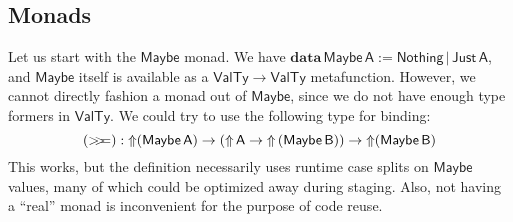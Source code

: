\documentclass[acmsmall,screen,review,anonymous]{acmart}
\newcommand{\msf}[1]{{\mathsf{#1}}}
\newcommand{\mbf}[1]{{\mathbf{#1}}}
\newcommand{\data}{\mbf{data}\,}
\newcommand{\vA}{\mathsf{A}}
\newcommand{\vB}{\mathsf{B}}
\newcommand{\Up}{{\Uparrow}}
\newcommand{\bind}{\mathbin{>\!\!>\mkern-6.7mu=}}
\newcommand{\VTy}{\msf{ValTy}}
\newcommand{\Maybe}{\msf{Maybe}}
\newcommand{\Nothing}{\msf{Nothing}}
\newcommand{\Just}{\msf{Just}}
\theoremstyle{remark}
\begin{document}
\subsection{Monads}\label{sec:monads}

Let us start with the $\Maybe$ monad. We have $\data \Maybe\,\vA :=
\Nothing\,|\,\Just\,\vA$, and $\Maybe$ itself is available as a $\VTy \to \VTy$
metafunction. However, we cannot directly fashion a monad out of $\Maybe$, since
we do not have enough type formers in $\VTy$. We could try to use the following
type for binding:
\[ (\bind) : \Up(\Maybe\,\vA) \to (\Up\,\vA \to \Up\,(\Maybe\,\vB)) \to \Up(\Maybe\,\vB) \]
This works, but the definition necessarily uses runtime case splits on $\Maybe$
values, many of which could be optimized away during staging. Also, not having
a ``real'' monad is inconvenient for the purpose of code reuse.
\end{document}
